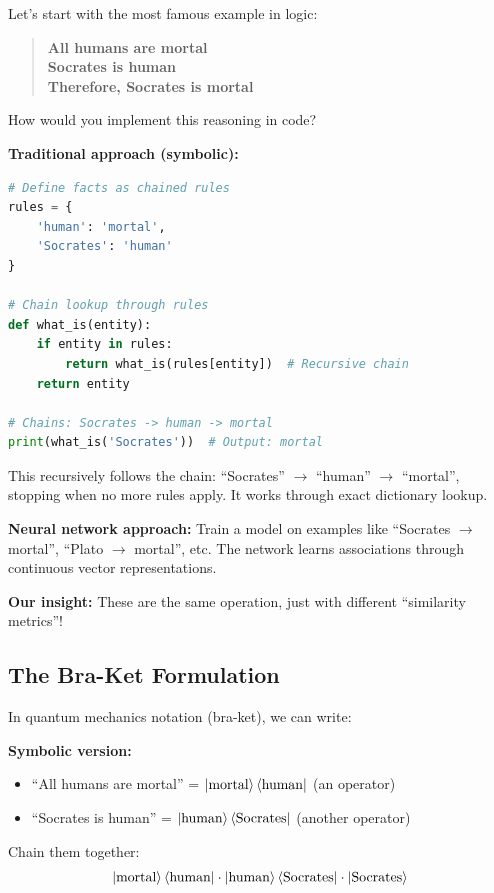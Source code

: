 \documentclass[11pt,a4paper]{article}
\theoremstyle{definition}
\begin{document}
Let's start with the most famous example in logic:

\begin{quote}
\textbf{All humans are mortal}\\
\textbf{Socrates is human}\\
\textbf{Therefore, Socrates is mortal}
\end{quote}

How would you implement this reasoning in code?

\textbf{Traditional approach (symbolic):}
\begin{lstlisting}[language=Python]
# Define facts as chained rules
rules = {
    'human': 'mortal',
    'Socrates': 'human'
}

# Chain lookup through rules
def what_is(entity):
    if entity in rules:
        return what_is(rules[entity])  # Recursive chain
    return entity

# Chains: Socrates -> human -> mortal
print(what_is('Socrates'))  # Output: mortal
\end{lstlisting}

This recursively follows the chain: ``Socrates'' $\to$ ``human'' $\to$ ``mortal'', stopping when no more rules apply. It works through exact dictionary lookup.

\textbf{Neural network approach:}
Train a model on examples like ``Socrates $\to$ mortal'', ``Plato $\to$ mortal'', etc. The network learns associations through continuous vector representations.

\textbf{Our insight:} These are the same operation, just with different ``similarity metrics''!

\subsection{The Bra-Ket Formulation}

In quantum mechanics notation (bra-ket), we can write:

\textbf{Symbolic version:}
\begin{itemize}
\item ``All humans are mortal'' = $\ket{\text{mortal}}\bra{\text{human}}$ (an operator)
\item ``Socrates is human'' = $\ket{\text{human}}\bra{\text{Socrates}}$ (another operator)
\end{itemize}

Chain them together:
\begin{equation}
\ket{\text{mortal}}\bra{\text{human}} \cdot \ket{\text{human}}\bra{\text{Socrates}} \cdot \ket{\text{Socrates}}
\end{equation}
\end{document}
